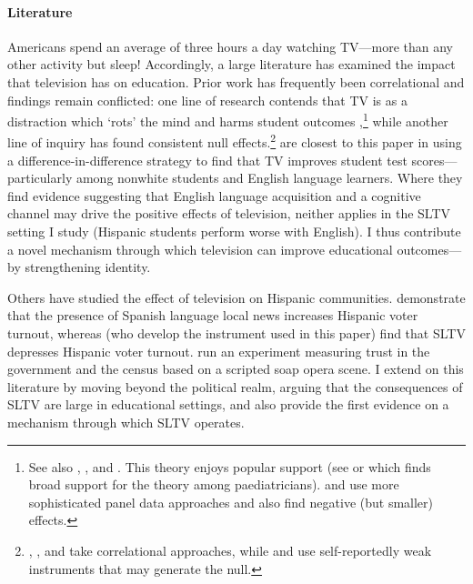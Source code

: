 \documentclass[11pt]{article}
\begin{document}
\paragraph{Literature} Americans spend an average of three hours a day watching TV---more than any other activity but sleep! Accordingly, a large literature has examined the impact that television has on education. Prior work has frequently been correlational and findings remain conflicted: one line of research contends that TV is as a distraction which `rots' the mind and harms student outcomes \citep{zavodny_does_2006},\footnote{ See also \cite{aksoy2000panel}, \cite{hornik1981out}, and \cite{keith1986parental}. This theory enjoys popular support (see \cite{winn_plug-drug_2002} or \cite{gentile_well-child_2004} which finds broad support for the theory among paediatricians). \cite{huang2010dynamic} and \cite{nakamuro2015television} use more sophisticated panel data approaches and also find negative (but smaller) effects.} while another line of inquiry has found consistent null effects.\footnote{ \cite{gaddy1986television}, \cite{gortmaker1990impact}, and \cite{hu2020relationship} take correlational approaches, while \cite{munasib2010idiot} and \cite{kureishi2013does} use self-reportedly weak instruments that may generate the null.}  \cite{gentzkow_preschool_2008} are closest to this paper in using a difference-in-difference strategy to find that TV improves student test scores---particularly among nonwhite students and English language learners. Where they find evidence suggesting that English language acquisition and a cognitive channel may drive the positive effects of television, neither applies in the SLTV setting I study (Hispanic students perform worse with English). I thus contribute a novel mechanism through which television can improve educational outcomes---by strengthening identity.

Others have studied the effect of television on Hispanic communities. \cite{oberholzer-gee_media_2009} demonstrate that the presence of Spanish language local news increases Hispanic voter turnout, whereas  \cite{velez_tuning_2019} (who develop the instrument used in this paper) find that SLTV depresses Hispanic voter turnout. \cite{trujillo_devil_2012} run an experiment measuring trust in the government and the census based on a scripted soap opera scene. I extend on this literature by moving beyond the political realm, arguing that the consequences of SLTV are large in educational settings, and also provide the first evidence on a mechanism through which SLTV operates.
\end{document}
